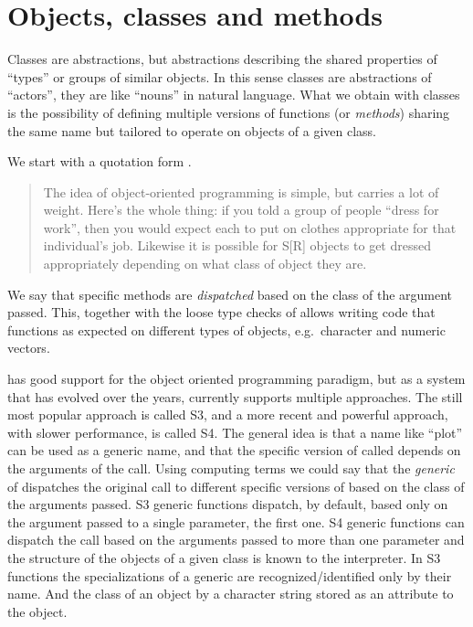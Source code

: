 \documentclass[krantz2]{krantz}\usepackage{knitr}%
\begin{document}
\section{Objects, classes and methods}\label{sec:script:objects:classes:methods}

Classes are abstractions, but abstractions describing the shared properties of ``types'' or groups of similar objects. In this sense classes are abstractions of ``actors'', they are like ``nouns'' in natural language. What we obtain with classes is the possibility of defining multiple versions of functions (or \emph{methods}) sharing the same name but tailored to operate on objects of a given class.

We start with a quotation form  \autocite[][, page 13]{Burns1998}.
\begin{quotation}
The idea of object-oriented programming is simple, but carries a lot of weight.
Here's the whole thing: if you told a group of people ``dress for work'', then
you would expect each to put on clothes appropriate for that individual's job.
Likewise it is possible for S[R] objects to get dressed appropriately depending on
what class of object they are.
\end{quotation}

We say that specific methods are \emph{dispatched} based on the class of the argument passed. This, together with the loose type checks of \Rlang allows writing code that functions as expected on different types of objects, e.g.\ character and numeric vectors.

\Rlang has good support for the object oriented programming paradigm, but as a system that has evolved over the years, currently \Rlang supports multiple approaches. The still most popular approach is called S3, and a more recent and powerful approach, with slower performance, is called S4. The general idea is that a name like ``plot'' can be used as a generic name, and that the specific version of  called depends on the arguments of the call. Using computing terms we could say that the \emph{generic} of  dispatches the original call to different specific versions of  based on the class of the arguments passed. S3 generic functions dispatch, by default, based only on the argument passed to a single parameter, the first one. S4 generic functions can dispatch the call based on the arguments passed to more than one parameter and the structure of the objects of a given class is known to the interpreter. In S3 functions the specializations of a generic are recognized/identified only by their name. And the class of an object by a character string stored as an attribute to the object.
\end{document}
